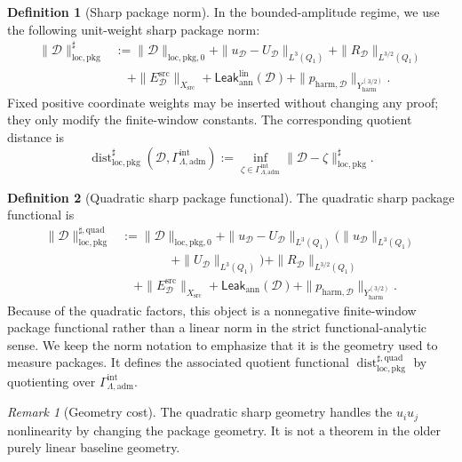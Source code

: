 \documentclass[11pt]{article}
\numberwithin{equation}{section}
\theoremstyle{definition}
\newtheorem{definition}[definition]{Definition}
\theoremstyle{remark}
\newtheorem{remark}[remark]{Remark}
\newcommand{\loc}{\mathrm{loc}}
\newcommand{\pkg}{\mathrm{pkg}}
\newcommand{\adm}{\mathrm{adm}}
\newcommand{\harm}{\mathrm{harm}}
\newcommand{\src}{\mathrm{src}}
\newcommand{\Leak}{\mathsf{Leak}}
\newcommand{\Dist}{\operatorname{dist}}
\newcommand{\calD}{\mathcal D}
\newcommand{\Xsrc}{X_{\src}}
\newcommand{\Yharm}{Y_{\harm}^{(3/2)}}
\newcommand{\Qone}{Q_1}
\newcommand{\Gadm}{\Gamma^{\mathrm{int}}_{\Lambda,\adm}}
\begin{document}
\begin{definition}[Sharp package norm]
\label{ps:def:sharp-package-norm}
In the bounded-amplitude regime, we use the following unit-weight sharp
package norm:
\[
\begin{aligned}
    \|\calD\|_{\loc,\pkg}^{\sharp}
    &:=
    \|\calD\|_{\loc,\pkg,0}
    +
    \|u_{\calD}-U_{\calD}\|_{L^3(\Qone)}
    +
    \|R_{\calD}\|_{L^{3/2}(\Qone)}
\\
    &\quad+
    \|E^{\src}_{\calD}\|_{\Xsrc}
    +
    \Leak_{\mathrm{ann}}^{\mathrm{lin}}(\calD)
    +
    \|p_{\harm,\calD}\|_{\Yharm}.
\end{aligned}
\]
Fixed positive coordinate weights may be inserted without changing any proof;
they only modify the finite-window constants.  The corresponding quotient
distance is
\[
    \Dist_{\loc,\pkg}^{\sharp}(\calD,\Gadm)
    :=
    \inf_{\zeta\in\Gadm}
    \|\calD-\zeta\|_{\loc,\pkg}^{\sharp}.
\]
\end{definition}

\begin{definition}[Quadratic sharp package functional]
\label{ps:def:quadratic-sharp-package-norm}
The quadratic sharp package functional is
\[
\begin{aligned}
    \|\calD\|_{\loc,\pkg}^{\sharp,\mathrm{quad}}
    &:=
    \|\calD\|_{\loc,\pkg,0}
    +
    \|u_{\calD}-U_{\calD}\|_{L^3(\Qone)}
    \bigl(
        \|u_{\calD}\|_{L^3(\Qone)}
\\
    &\qquad\qquad+
        \|U_{\calD}\|_{L^3(\Qone)}
    \bigr)
    +
    \|R_{\calD}\|_{L^{3/2}(\Qone)}
\\
    &\quad+
    \|E^{\src}_{\calD}\|_{\Xsrc}
    +
    \Leak_{\mathrm{ann}}(\calD)
    +
    \|p_{\harm,\calD}\|_{\Yharm}.
\end{aligned}
\]
Because of the quadratic factors, this object is a nonnegative finite-window
package functional rather than a linear norm in the strict functional-analytic
sense.  We keep the norm notation to emphasize that it is the geometry used to
measure packages.  It defines the associated quotient functional
\(\Dist_{\loc,\pkg}^{\sharp,\mathrm{quad}}\) by quotienting over \(\Gadm\).
\end{definition}

\begin{remark}[Geometry cost]
The quadratic sharp geometry handles the \(u_i u_j\) nonlinearity by changing
the package geometry.  It is not a theorem in the older purely linear baseline
geometry.
\end{remark}
\end{document}
